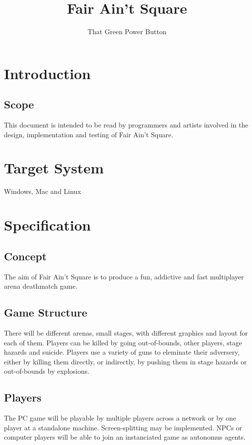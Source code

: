 \documentclass{article}
\author{That Green Power Button}
\title{Fair Ain't Square}
\begin{document}
\maketitle

\section{Introduction}

\subsection{Scope}
This document is intended to be read by programmers and artists involved in the design, implementation and testing of Fair Ain't Square.

\section{Target System}
Windows, Mac and Linux

\section{Specification}
\subsection{Concept}
The aim of Fair Ain't Square is to produce a fun, addictive and fast multiplayer arena deathmatch game.

\subsection{Game Structure}
There will be different arenas, small stages, with different graphics and layout for each of them. Players can be killed by going out-of-bounds, other players, stage hazards and suicide. Players use a variety of guns to eleminate their adversery, either by killing them directly, or indirectly, by pushing them in stage hazards or out-of-bounds by explosions.

\subsection{Players}
The PC game will be playable by multiple players across a network or by one player at a standalone machine. Screen-splitting may be implemented. NPCs or computer players will be able to join an instanciated game as autonomus agents.
\end{document}
